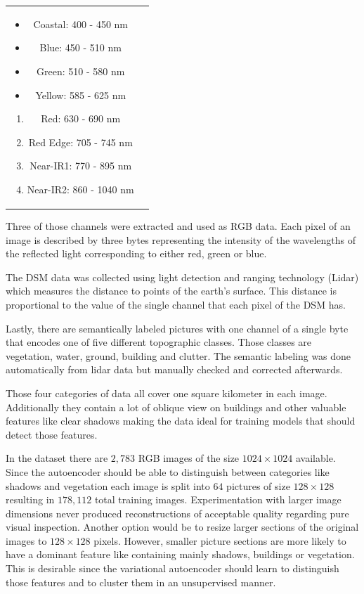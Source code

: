 \begin{tabular} {c c}
    \parbox{5cm}{
        \begin{itemize}
            \item Coastal: 400 - 450 nm 			
            \item Blue: 450 - 510 nm			
            \item Green: 510 - 580 nm 			
            \item Yellow: 585 - 625 nm
        \end{itemize}
    }
    \parbox{5cm}{
        \begin{enumerate} 			
            \item Red: 630 - 690 nm
            \item Red Edge: 705 - 745 nm
            \item Near-IR1: 770 - 895 nm
            \item Near-IR2: 860 - 1040 nm
        \end{enumerate}
    }
\end{tabular}
\bigskip

Three of those channels were extracted and used as RGB data. 
Each pixel of an image is described by three bytes representing the intensity of the wavelengths of the 
reflected light corresponding to either red, green or blue.

The DSM data was collected using light detection and ranging technology (Lidar) which measures the 
distance to points of the earth's surface. This distance is proportional to the value of the single channel
that each pixel of the DSM has.

Lastly, there are semantically labeled pictures with one channel of a single byte that encodes one of five 
different topographic classes. Those classes are vegetation, water, ground, building and clutter. 
The semantic labeling was done automatically from lidar data but manually checked and corrected afterwards.

Those four categories of data all cover one square kilometer in each image.
Additionally they contain a lot of oblique view on buildings and other valuable
features like clear shadows making the data ideal for training models that should 
detect those features.

In the dataset there are $2,783$ RGB images of the size $1024\times 1024$ available. Since the autoencoder should
be able to distinguish between categories like shadows and vegetation each image is split into $64$
pictures of size $128\times 128$ resulting in $178,112$ total training images. 
Experimentation with larger image dimensions never produced reconstructions of acceptable
quality regarding pure visual inspection.
Another option would be to resize larger sections of the original images to $128\times 128$ pixels. However,
smaller picture sections
are more likely to have a dominant feature like containing mainly shadows, buildings or vegetation.
This is desirable since the variational autoencoder should learn to distinguish those features and to cluster
them in an unsupervised manner.


